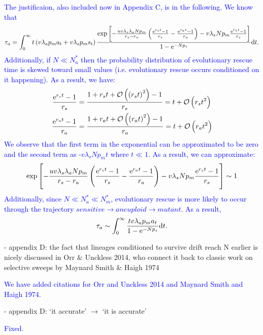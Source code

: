 \documentclass[12pt]{extarticle}
\renewcommand{\d}{{\rm d}}
\newcommand{\e}{{\rm e}}
\renewcommand{\Delta}{r}
\begin{document}
\textcolor{blue}{
The justificaion, also included now in Appendix C, is in the following. 
We know that
\begin{align*}
\tau_a=\int_0^\infty t\left(v\lambda_ap_ma_t+v\lambda_sp_ms_t\right)\frac{\exp\left[-\frac{uv\lambda_s\lambda_aNp_m}{\Delta_s-\Delta_a}\left(\frac{\e^{\Delta_s t}-1}{\Delta_s}-\frac{\e^{\Delta_a t}-1}{\Delta_a}\right)-v\lambda_sNp_m\frac{\e^{\Delta_s t}-1}{\Delta_s}\right] }{1-\e^{-Np_s}}\d t.
\end{align*}
Additionally, if $N\ll N_a^*$ then the probability distribution of evolutionary rescue time is skewed toward small values (i.e. evolutionary rescue occurs conditioned on it happening). As a result, we have: 
\begin{align*}
\frac{\e^{\Delta_s t}-1}{\Delta_s}&=\frac{1+\Delta_s t+\mathcal{O}\left(\left(\Delta_st\right)^2\right)-1}{\Delta_s}=t+\mathcal{O}\left(\Delta_st^2\right)\\
\frac{\e^{\Delta_a t}-1}{\Delta_a}&=\frac{1+\Delta_a t+\mathcal{O}\left(\left(\Delta_at\right)^2\right)-1}{\Delta_a}=t+\mathcal{O}\left(\Delta_at^2\right)
\end{align*}
We observe that the first term in the exponential can be approximated to be zero and the second term as -$v\lambda_sNp_mt$ where $t\ll1$. As a result, we can approximate:
\begin{equation*}
\exp\left[-\frac{uv\lambda_s\lambda_aNp_m}{\Delta_s-\Delta_a}\left(\frac{\e^{\Delta_s t}-1}{\Delta_s}-\frac{\e^{\Delta_a t}-1}{\Delta_a}\right)-v\lambda_sNp_m\frac{\e^{\Delta_s t}-1}{\Delta_s}\right] \sim 1
\end{equation*}
Additionally, since $N\ll N_a^*\ll N_m^*$, evolutionary rescue is more likely to occur through the trajectory $sensitive \rightarrow aneuploid \rightarrow mutant$. As a result,
\begin{equation*}
\tau_a\sim\int_0^\infty \frac{tv\lambda_ap_ma_t}{1-\e^{-Np_s}}\d t.
\end{equation*}
}

- appendix D: the fact that lineages conditioned to survive drift reach N earlier is nicely discussed in Orr $\&$ Unckless 2014, who connect it back to classic work on selective sweeps by Maynard Smith $\&$ Haigh 1974

\textcolor{blue}{We have added citations for Orr and Unckless 2014 and Maynard Smith and Haigh 1974. } %

- appendix D: `it accurate' $\rightarrow$ `it is accurate'

\textcolor{blue}{Fixed.} %
\end{document}
